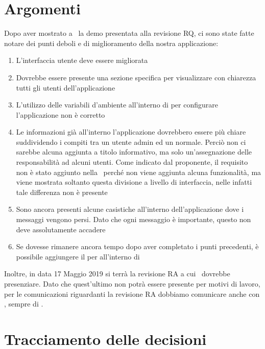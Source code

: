     \section{Argomenti}
    Dopo aver mostrato a \DZ~la demo presentata alla revisione RQ, ci sono state fatte notare dei punti deboli e di miglioramento della nostra applicazione:
    \begin{enumerate}
        \item L'interfaccia utente deve essere migliorata
        \item Dovrebbe essere presente una sezione specifica per visualizzare con chiarezza tutti gli utenti dell'applicazione
        \item L'utilizzo delle variabili d'ambiente all'interno di  per configurare l'applicazione non è corretto
        \item Le informazioni già all'interno l'applicazione dovrebbero essere più chiare suddividendo i compiti tra un utente admin ed un normale. Perciò non ci sarebbe alcuna aggiunta a titolo informativo, ma solo un'assegnazione delle responsabilità ad alcuni utenti. Come indicato dal proponente, il requisito non è stato aggiunto nella \AdRd\ perché non viene aggiunta alcuna funzionalità, ma viene mostrata soltanto questa divisione a livello di interfaccia, nelle  infatti tale differenza non è presente
        \item Sono ancora presenti alcune casistiche all'interno dell'applicazione dove i messaggi vengono persi. Dato che ogni messaggio è importante, questo non deve assolutamente accadere
        \item Se dovesse rimanere ancora tempo dopo aver completato i punti precedenti, è possibile aggiungere il  per  all'interno di \progetto
    \end{enumerate}

    Inoltre, in data 17 Maggio 2019 si terrà la revisione RA a cui \DZ~dovrebbe presenziare. Dato che quest'ultimo non potrà essere presente per motivi di lavoro, per le comunicazioni riguardanti la revisione RA dobbiamo comunicare anche con \LuC, sempre di \II.

    \section{Tracciamento delle decisioni}

